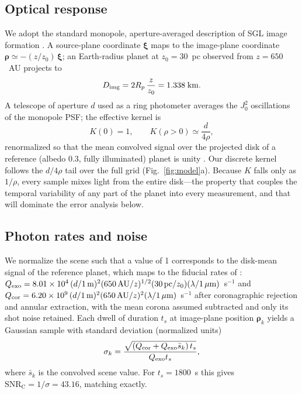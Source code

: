 ﻿\documentclass[twocolumn,10pt]{article}
\begin{document}
\subsection{Optical response}
We adopt the standard monopole, aperture-averaged description of SGL
image formation \citep{tt20psf,toth21,tur26bench}. A source-plane
coordinate $\boldsymbol{\xi}$ maps to the image-plane coordinate
$\boldsymbol{\rho}\simeq-(z/z_0)\,\boldsymbol{\xi}$; an Earth-radius
planet at $z_0=30$~pc observed from $z=650$~AU projects to
\begin{equation}
D_{\rm img}=2R_p\,\frac{z}{z_0}=1.338\;{\rm km}.
\end{equation}
A telescope of aperture $d$ used as a ring photometer averages the
$J_0^2$ oscillations of the monopole PSF; the effective kernel is
\begin{equation}
K(0)=1,\qquad K(\rho>0)\simeq\frac{d}{4\rho},
\label{eq:kernel}
\end{equation}
renormalized so that the mean convolved signal over the projected disk
of a reference (albedo 0.3, fully illuminated) planet is unity
\citep{tur26bench}. Our discrete kernel follows the $d/4\rho$ tail over
the full grid (Fig.~\ref{fig:model}a). Because $K$ falls only as
$1/\rho$, every sample mixes light from the entire disk---the property
that couples the temporal variability of any part of the planet into
every measurement, and that will dominate the error analysis below.

\subsection{Photon rates and noise}
We normalize the scene such that a value of 1 corresponds to the
disk-mean signal of the reference planet, which maps to the fiducial
rates of \citet{tt22mnras}:
$Q_{\rm exo}=8.01\times10^4\,(d/1\,{\rm m})^2(650\,{\rm AU}/z)^{1/2}
(30\,{\rm pc}/z_0)(\lambda/1\,\mu{\rm m})$~s$^{-1}$ and
$Q_{\rm cor}=6.20\times10^9\,(d/1\,{\rm m})^2(650\,{\rm AU}/z)^2
(\lambda/1\,\mu{\rm m})$~s$^{-1}$ after coronagraphic rejection and
annular extraction, with the mean corona assumed subtracted and only its
shot noise retained. Each dwell of duration $t_s$ at image-plane position
$\boldsymbol{\rho}_k$ yields a Gaussian sample with standard deviation
(normalized units)
\begin{equation}
\sigma_k=\frac{\sqrt{(Q_{\rm cor}+Q_{\rm exo}\bar{s}_k)\,t_s}}
{Q_{\rm exo}t_s},
\label{eq:noise}
\end{equation}
where $\bar s_k$ is the convolved scene value. For $t_s=1800$~s this
gives $\mathrm{SNR_C}=1/\sigma=43.16$, matching \citet{tur26bench}
exactly.
\end{document}
